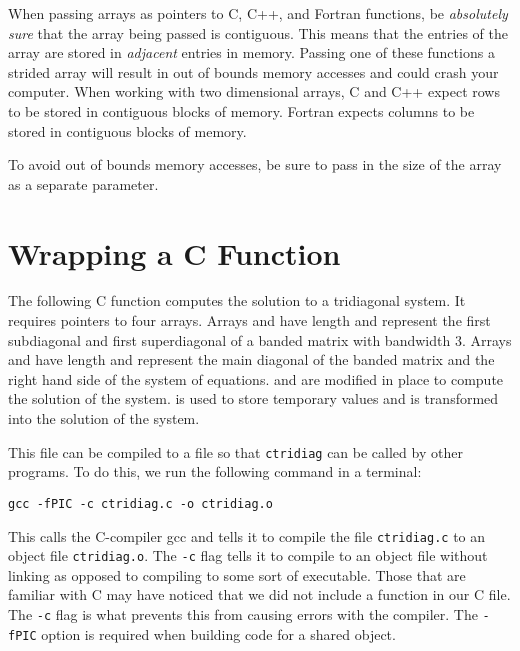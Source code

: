 \begin{warn}
When passing arrays as pointers to C, C++, and Fortran functions, be \emph{absolutely sure} that the array being passed is contiguous.
This means that the entries of the array are stored in \emph{adjacent} entries in memory.
Passing one of these functions a strided array will result in out of bounds memory accesses and could crash your computer.
When working with two dimensional arrays, C and C++ expect rows to be stored in contiguous blocks of memory.
Fortran expects columns to be stored in contiguous blocks of memory.

To avoid out of bounds memory accesses, be sure to pass in the size of the array as a separate parameter.
\end{warn}

\section*{Wrapping a C Function}
The following C function computes the solution to a tridiagonal system.
It requires pointers to four arrays.
Arrays  and  have length  and represent the first subdiagonal and first superdiagonal of a banded matrix with bandwidth 3.
Arrays  and  have length  and represent the main diagonal of the banded matrix and the right hand side of the system of equations.
 and  are modified in place to compute the solution of the system.
 is used to store temporary values and  is transformed into the solution of the system.



This file can be compiled to a  file so that \texttt{ctridiag} can be called by other programs. 
To do this, we run the following command in a terminal:
\begin{lstlisting}[style=ShellInput]
gcc -fPIC -c ctridiag.c -o ctridiag.o
\end{lstlisting}
This calls the C-compiler gcc and tells it to compile the file \texttt{ctridiag.c} to an object file \texttt{ctridiag.o}.
The \texttt{-c} flag tells it to compile to an object file without linking as opposed to compiling to some sort of executable.
Those that are familiar with C may have noticed that we did not include a  function in our C file.
The \texttt{-c} flag is what prevents this from causing errors with the compiler.
The \texttt{-fPIC} option is required when building code for a shared object.

